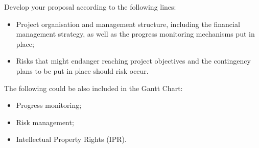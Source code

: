 Develop your proposal according to the following lines:
\begin{itemize}
\item Project organisation and management structure, including the financial management strategy, as well as the progress monitoring mechanisms put in place;
\item Risks that might endanger reaching project objectives and the contingency plans to be put in place should risk occur.
\end{itemize}
The following could be also included in the Gantt Chart:
\begin{itemize}
\item Progress monitoring;
\item Risk management;
\item Intellectual Property Rights (IPR).
\end{itemize}

\newpage


